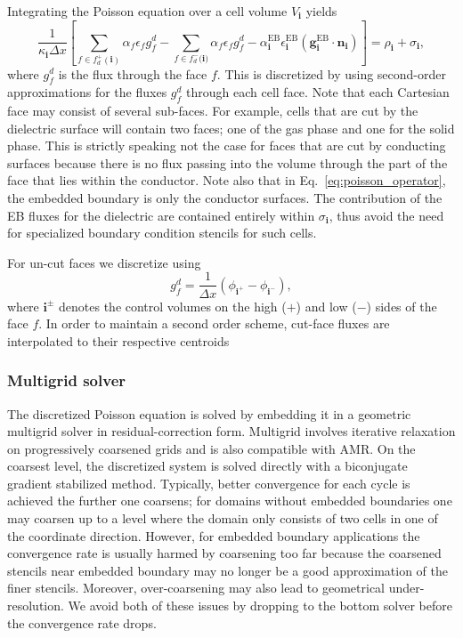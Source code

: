 \documentclass[3p]{elsarticle}
\begin{document}
Integrating the Poisson equation over a cell volume $V_{\bm{i}}$ yields 
\begin{equation}
  \label{eq:poisson_operator}
  \frac{1}{\kappa_{\bm{i}}\Delta x}\left[\sum_{f\in f_d^+(\bm{i})}\alpha_f\epsilon_fg_f^d - \sum_{f\in f_d^-(\bm{i)}}\alpha_f\epsilon_fg_f^d - \alpha_{\bm{i}}^{\text{EB}}\epsilon_{\bm{i}}^{\text{EB}}\left(\bm{g}^{\text{EB}}_{\bm{i}}\cdot\bm{n}_{\bm{i}}\right)\right] = \rho_{\bm{i}} + \sigma_{\bm{i}},
\end{equation}
where $g_f^d$ is the flux through the face $f$. This is discretized by using second-order approximations for the fluxes $g_f^d$ through each cell face. Note that each Cartesian face may consist of several sub-faces. For example, cells that are cut by the dielectric surface will contain two faces; one of the gas phase and one for the solid phase. This is strictly speaking not the case for faces that are cut by conducting surfaces because there is no flux passing into the volume through the part of the face that lies within the conductor. Note also that in Eq.~\eqref{eq:poisson_operator}, the embedded boundary is only the conductor surfaces. The contribution of the EB fluxes for the dielectric are contained entirely within $\sigma_{\bm{i}}$, thus avoid the need for specialized boundary condition stencils for such cells. 

For un-cut faces we discretize using
\begin{equation}
  g_f^d = \frac{1}{\Delta x}\left(\phi_{\bm{i}^+}-\phi_{\bm{i}^-}\right),
\end{equation}
where $\bm{i}^\pm$ denotes the control volumes on the high ($+$) and low ($-$) sides of the face $f$. In order to maintain a second order scheme, cut-face fluxes are interpolated to their respective centroids

\subsubsection{Multigrid solver}
The discretized Poisson equation is solved by embedding it in a geometric multigrid solver in residual-correction form. Multigrid involves iterative relaxation on progressively coarsened grids and is also compatible with AMR. On the coarsest level, the discretized system is solved directly with a biconjugate gradient stabilized method. Typically, better convergence for each cycle is achieved the further one coarsens; for domains without embedded boundaries one may coarsen up to a level where the domain only consists of two cells in one of the coordinate direction. However, for embedded boundary applications the convergence rate is usually harmed by coarsening too far because the coarsened stencils near embedded boundary may no longer be a good approximation of the finer stencils. Moreover, over-coarsening may also lead to geometrical under-resolution. We avoid both of these issues by dropping to the bottom solver before the convergence rate drops. 
\end{document}

